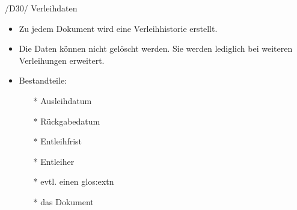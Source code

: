 /D30/ Verleihdaten
\begin{itemize}
  \item Zu jedem Dokument wird eine Verleihhistorie erstellt.
  \item Die Daten können nicht gelöscht werden. Sie werden lediglich bei weiteren Verleihungen erweitert.
  \item Bestandteile:
  \begin{itemize}
    \item[*] Ausleihdatum
    \item[*] Rückgabedatum
    \item[*] Entleihfrist
    \item[*] Entleiher
    \item[*] evtl. einen \gls{glos:ext}n
    \item[*] das Dokument
  \end{itemize}
\end{itemize}